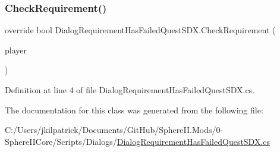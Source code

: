 \subsubsection{\texorpdfstring{CheckRequirement()}{CheckRequirement()}}
{\footnotesize\ttfamily override bool Dialog\+Requirement\+Has\+Failed\+Quest\+S\+D\+X.\+Check\+Requirement (\begin{DoxyParamCaption}\item[{Entity\+Player}]{player }\end{DoxyParamCaption})}



Definition at line 4 of file Dialog\+Requirement\+Has\+Failed\+Quest\+S\+D\+X.\+cs.



The documentation for this class was generated from the following file\+:\begin{DoxyCompactItemize}
\item 
C\+:/\+Users/jkilpatrick/\+Documents/\+Git\+Hub/\+Sphere\+I\+I.\+Mods/0-\/\+Sphere\+I\+I\+Core/\+Scripts/\+Dialogs/\mbox{\hyperlink{_dialog_requirement_has_failed_quest_s_d_x_8cs}{Dialog\+Requirement\+Has\+Failed\+Quest\+S\+D\+X.\+cs}}\end{DoxyCompactItemize}
